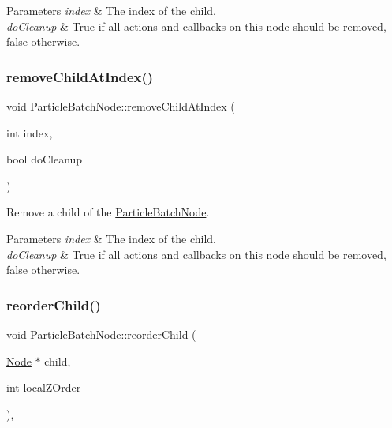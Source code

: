 \begin{DoxyParams}{Parameters}
{\em index} & The index of the child. \\
\hline
{\em do\+Cleanup} & True if all actions and callbacks on this node should be removed, false otherwise. \\
\hline
\end{DoxyParams}
\mbox{\label{classParticleBatchNode_a7f46acad56bfa65d5903121072f22a1a}} 
\subsubsection{\texorpdfstring{remove\+Child\+At\+Index()}{removeChildAtIndex()}\hspace{0.1cm}{\footnotesize\ttfamily [2/2]}}
{\footnotesize\ttfamily void Particle\+Batch\+Node\+::remove\+Child\+At\+Index (\begin{DoxyParamCaption}\item[{int}]{index,  }\item[{bool}]{do\+Cleanup }\end{DoxyParamCaption})}

Remove a child of the \hyperlink{classParticleBatchNode}{Particle\+Batch\+Node}.


\begin{DoxyParams}{Parameters}
{\em index} & The index of the child. \\
\hline
{\em do\+Cleanup} & True if all actions and callbacks on this node should be removed, false otherwise. \\
\hline
\end{DoxyParams}
\mbox{\label{classParticleBatchNode_a252befcd88cd095ab65809e94bb852ad}} 
\subsubsection{\texorpdfstring{reorder\+Child()}{reorderChild()}\hspace{0.1cm}{\footnotesize\ttfamily [1/2]}}
{\footnotesize\ttfamily void Particle\+Batch\+Node\+::reorder\+Child (\begin{DoxyParamCaption}\item[{\hyperlink{classNode}{Node} $\ast$}]{child,  }\item[{int}]{local\+Z\+Order }\end{DoxyParamCaption})\hspace{0.3cm}{\ttfamily [override]}, {\ttfamily [virtual]}}


